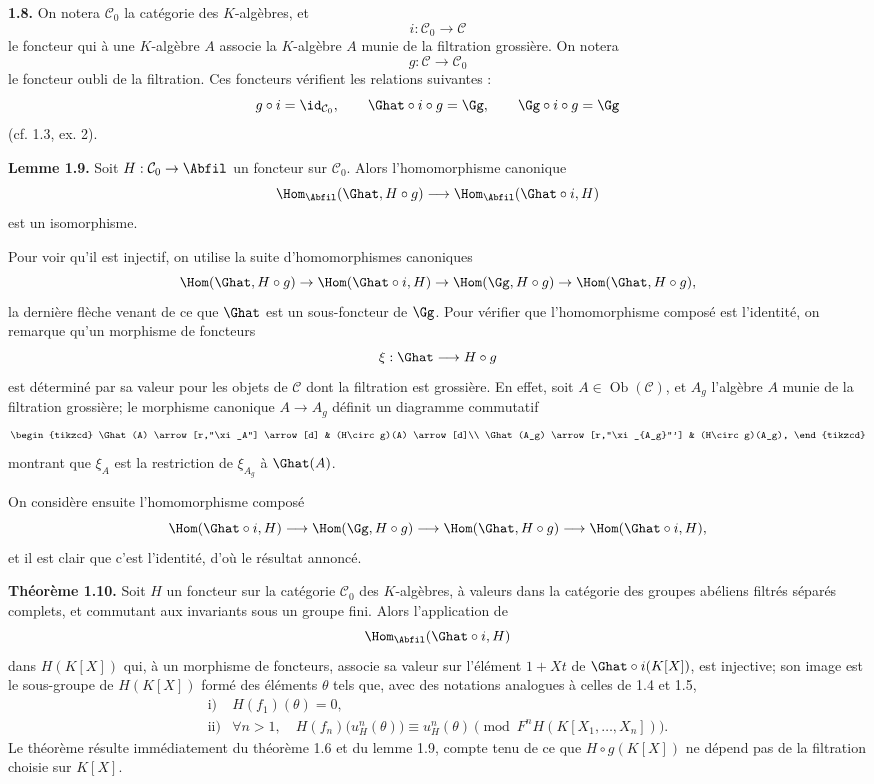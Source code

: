 \documentclass[11pt]{article}
\begin{document}
\textbf{1.8.} On notera \(\mathcal C_0\) la catégorie des \(K\)-algèbres, et
\[
  i:\mathcal C_0\longrightarrow \mathcal C
\]
le foncteur qui à une \(K\)-algèbre \(A\) associe la \(K\)-algèbre \(A\) munie de la filtration grossière. On notera
\[
  g:\mathcal C\longrightarrow\mathcal C_0
\]
le foncteur oubli de la filtration. Ces foncteurs vérifient les relations suivantes :
\[
  g\circ i=\id_{\mathcal C_0},\qquad
  \Ghat\circ i\circ g=\Gg,\qquad
  \Gg\circ i\circ g=\Gg
\]
(cf. 1.3, ex. 2).

\textbf{Lemme 1.9.} Soit \(H:\mathcal C_0\to\Abfil\) un foncteur sur \(\mathcal C_0\). Alors l'homomorphisme canonique
\[
  \Hom_{\Abfil}(\Ghat,H\circ g)
  \longrightarrow
  \Hom_{\Abfil}(\Ghat\circ i,H)
\]
est un isomorphisme.

Pour voir qu'il est injectif, on utilise la suite d'homomorphismes canoniques
\[
  \Hom(\Ghat,H\circ g)\to
  \Hom(\Ghat\circ i,H)\to
  \Hom(\Gg,H\circ g)\to
  \Hom(\Ghat,H\circ g),
\]
la dernière flèche venant de ce que \(\Ghat\) est un sous-foncteur de \(\Gg\). Pour vérifier que l'homomorphisme composé est l'identité, on remarque qu'un morphisme de foncteurs
\[
  \xi:\Ghat\longrightarrow H\circ g
\]
est déterminé par sa valeur pour les objets de \(\mathcal C\) dont la filtration est grossière. En effet, soit \(A\in\operatorname{Ob}(\mathcal C)\), et \(A_g\) l'algèbre \(A\) munie de la filtration grossière; le morphisme canonique \(A\to A_g\) définit un diagramme commutatif
\[
\begin{tikzcd}
\Ghat(A) \arrow[r,"\xi_A"] \arrow[d] &
(H\circ g)(A) \arrow[d]\\
\Ghat(A_g) \arrow[r,"\xi_{A_g}"'] &
(H\circ g)(A_g),
\end{tikzcd}
\]
montrant que \(\xi_A\) est la restriction de \(\xi_{A_g}\) à \(\Ghat(A)\).

On considère ensuite l'homomorphisme composé
\[
  \Hom(\Ghat\circ i,H)\longrightarrow
  \Hom(\Gg,H\circ g)\longrightarrow
  \Hom(\Ghat,H\circ g)\longrightarrow
  \Hom(\Ghat\circ i,H),
\]
et il est clair que c'est l'identité, d'où le résultat annoncé.

\textbf{Théorème 1.10.} Soit \(H\) un foncteur sur la catégorie \(\mathcal C_0\) des \(K\)-algèbres, à valeurs dans la catégorie des groupes abéliens filtrés séparés complets, et commutant aux invariants sous un groupe fini. Alors l'application de
\[
  \Hom_{\Abfil}(\Ghat\circ i,H)
\]
dans \(H(K[X])\) qui, à un morphisme de foncteurs, associe sa valeur sur l'élément \(1+Xt\) de \(\Ghat\circ i(K[X])\), est injective; son image est le sous-groupe de \(H(K[X])\) formé des éléments \(\theta\) tels que, avec des notations analogues à celles de 1.4 et 1.5,
\[
\begin{array}{ll}
\text{i)}& H(f_1)(\theta)=0,\\[0.3em]
\text{ii)}& \forall n>1,\quad
H(f_n)\bigl(u_H^n(\theta)\bigr)\equiv u_H^n(\theta)
\pmod{F^nH(K[X_1,\ldots,X_n])}.
\end{array}
\]
Le théorème résulte immédiatement du théorème 1.6 et du lemme 1.9, compte tenu de ce que \(H\circ g(K[X])\) ne dépend pas de la filtration choisie sur \(K[X]\).
\end{document}
